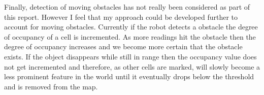 \documentclass{article}
\begin{document}
Finally, detection of moving obstacles has not really been considered as part of this report. However I feel that my approach could be developed further to account for moving obstacles. Currently if the robot detects a obstacle the degree of occupancy of a cell is incremented. As more readings hit the obstacle then the degree of occupancy increases and we become more certain that the obstacle exists. If the object disappears while still in range then the occupancy value does not get incremented and therefore, as other cells are marked, will slowly become a less prominent feature in the world until it eventually drops below the threshold and is removed from the map.
\nocite{*}

\end{document}
